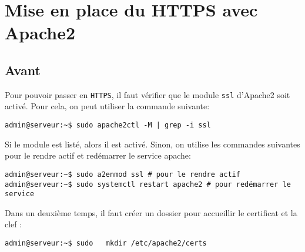 \section{Mise en place du HTTPS avec Apache2} \label{HTTPS}
\subsection{Avant}
Pour pouvoir passer en \texttt{HTTPS}, il faut vérifier que le module \texttt{ssl} d'Apache2 soit activé. Pour cela, on peut utiliser la commande suivante:
\begin{verbatim}
admin@serveur:~$ sudo apache2ctl -M | grep -i ssl
\end{verbatim}
Si le module est listé, alors il est activé. Sinon, on utilise les commandes suivantes pour le rendre actif et redémarrer le service apache:
\begin{verbatim}
admin@serveur:~$ sudo a2enmod ssl # pour le rendre actif 
admin@serveur:~$ sudo systemctl restart apache2 # pour redémarrer le service
\end{verbatim}

Dans un deuxième temps, il faut créer un dossier pour accueillir le certificat et la clef :


\begin{verbatim}
admin@serveur:~$ sudo   mkdir /etc/apache2/certs
\end{verbatim}




%  
%  

